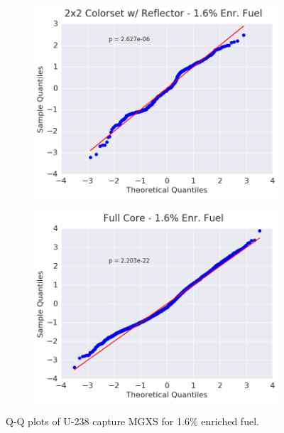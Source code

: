 \begin{figure}[h!]
\begin{subfigure}{0.5\textwidth}
  \centering
  \includegraphics[width=\linewidth]{figures/patterns/reflector/quantile/16-enr-capt-1}  \caption{}
  \label{fig:chap9-qq-reflector-1.6-capt}
\end{subfigure}%
\begin{subfigure}{0.5\textwidth}
  \centering
  \includegraphics[width=\linewidth]{figures/patterns/full-core/quantile/16-enr-capt-1} \caption{}
  \label{fig:chap9-qq-full-core-1.6-capt}
\end{subfigure}
\caption[Q-Q plots of U-238 capture MGXS for 1.6\% enriched fuel]{Q-Q plots of U-238 capture \ac{MGXS} for 1.6\% enriched fuel.}
\label{fig:chap9-qq-1.6-capt}
\end{figure}

